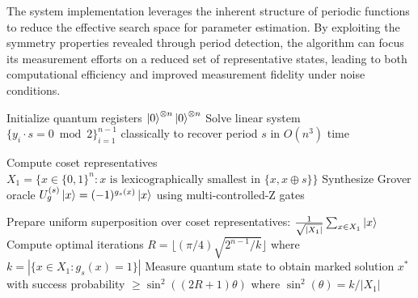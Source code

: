 \documentclass[journal]{IEEEtran}
\begin{document}
The system implementation leverages the inherent structure of periodic functions to reduce the effective search space for parameter estimation. By exploiting the symmetry properties revealed through period detection, the algorithm can focus its measurement efforts on a reduced set of representative states, leading to both computational efficiency and improved measurement fidelity under noise conditions.

\begin{algorithm}[!t]
\caption{Hybrid Algorithm with Dynamic Oracle Adaptation}
\label{alg:hybrid_doa}
\small

Initialize quantum registers $\ket{0}^{\otimes n} \ket{0}^{\otimes n}$\;
{}
{Solve linear system $\{y_i \cdot s = 0 \bmod 2\}_{i=1}^{n-1}$ classically to recover period $s$ in $O(n^3)$ time\;}

{Compute coset representatives $X_1 = \{x \in \{0,1\}^n : x \text{ is lexicographically smallest in } \{x, x \oplus s\}\}$\;}
{Synthesize Grover oracle $U_g^{(s)} \ket{x} = (-1)^{g_s(x)} \ket{x}$ using multi-controlled-Z gates\;}

{Prepare uniform superposition over coset representatives: $\frac{1}{\sqrt{|X_1|}} \sum_{x \in X_1} \ket{x}$\;}
{Compute optimal iterations $R = \lfloor (\pi / 4) \sqrt{2^{n-1} / k} \rfloor$ where $k = |\{x \in X_1 : g_s(x) = 1\}|$\;}
{Measure quantum state to obtain marked solution $x^*$ with success probability $\geq \sin^2((2R+1)\theta)$ where $\sin^2(\theta) = k/|X_1|$\;}
\end{algorithm}
\end{document}
